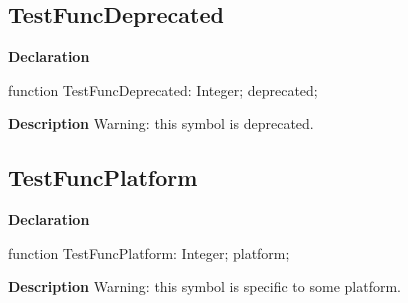 \documentclass{report}
\begin{document}
\subsection*{TestFuncDeprecated}
\begin{list}{}{
\setlength{\itemindent}{0cm}
\setlength{\listparindent}{0cm}
\setlength{\leftmargin}{\evensidemargin}
\addtolength{\leftmargin}{\tmplength}
\settowidth{\labelsep}{X}
\addtolength{\leftmargin}{\labelsep}
\setlength{\labelwidth}{\tmplength}
}
\begin{flushleft}
\item[\textbf{Declaration}\hfill]
\begin{ttfamily}
function TestFuncDeprecated: Integer; deprecated;\end{ttfamily}


\end{flushleft}
\par
\item[\textbf{Description}]
Warning: this symbol is deprecated.

 

\end{list}
\subsection*{TestFuncPlatform}
\begin{list}{}{
\setlength{\itemindent}{0cm}
\setlength{\listparindent}{0cm}
\setlength{\leftmargin}{\evensidemargin}
\addtolength{\leftmargin}{\tmplength}
\settowidth{\labelsep}{X}
\addtolength{\leftmargin}{\labelsep}
\setlength{\labelwidth}{\tmplength}
}
\begin{flushleft}
\item[\textbf{Declaration}\hfill]
\begin{ttfamily}
function TestFuncPlatform: Integer; platform;\end{ttfamily}


\end{flushleft}
\par
\item[\textbf{Description}]
Warning: this symbol is specific to some platform.

 

\end{list}
\end{document}
